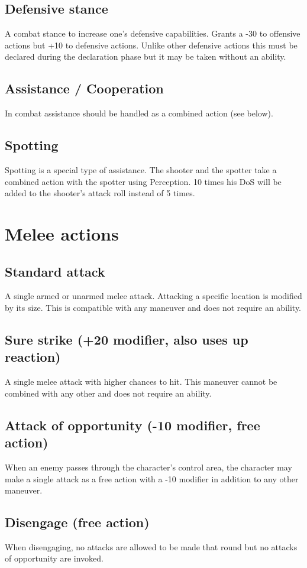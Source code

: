 \documentclass[12pt,a4paper,openany]{book}
\begin{document}
	\subsection*{Defensive stance}
	A combat stance to increase one’s defensive capabilities. Grants a -30 to offensive actions but +10 to defensive actions. Unlike other defensive actions this must be declared during the declaration phase but it may be taken without an ability.
	\subsection*{Assistance / Cooperation}
	In combat assistance should be handled as a combined action (see below).
	\subsection*{Spotting}
	Spotting is a special type of assistance. The shooter and the spotter take a combined action with the spotter using Perception. 10 times his DoS will be added to the shooter’s attack roll instead of 5 times.
	\section{Melee actions}
	\subsection*{Standard attack}
	A single armed or unarmed melee attack. Attacking a specific location is modified by its size. This is compatible with any maneuver and does not require an ability. 
	\subsection*{Sure strike (+20 modifier, also uses up reaction)}
	A single melee attack with higher chances to hit. This maneuver cannot be combined with any other and does not require an ability.
	\subsection*{Attack of opportunity (-10 modifier, free action)}
	When an enemy passes through the character’s control area, the character may make a single attack as a free action with a -10 modifier in addition to any other maneuver.
	\subsection*{Disengage (free action)}
	When disengaging, no attacks are allowed to be made that round but no attacks of opportunity are invoked.
\end{document}
